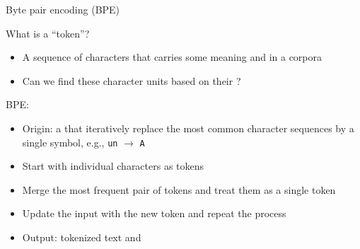 \documentclass[usenames,dvipsnames,notes,11pt,aspectratio=169,hyperref={colorlinks=true, linkcolor=blue}]{beamer}
\begin{document}
\begin{frame}
    {Byte pair encoding (BPE)}

    What is a ``token''?\\
    \begin{itemize}
        \item A sequence of characters that carries some meaning and  in a corpora
        \item Can we find these character units based on their ?
    \end{itemize}

    \pause\medskip
    BPE:\\
    \begin{itemize}
        \item Origin: a  that iteratively replace the most common character sequences by a single symbol, e.g., {\tt un} $\rightarrow$ {\tt A}
        \item Start with individual characters as tokens
        \item Merge the most frequent pair of tokens and treat them as a single token
        \item Update the input with the new token and repeat the process
        \item Output: tokenized text and 
    \end{itemize}
\end{frame}
\end{document}
